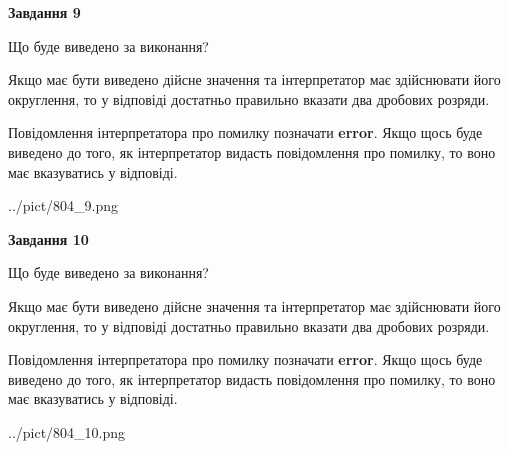 \documentclass[12pt, ukrainian]{article}
\begin{document}
{\begin {Large}
{\begin {center}\textbf{Завдання 9}\end {center}}\par
Що буде виведено за виконання? \par

Якщо має бути виведено дійсне значення та інтерпретатор має здійснювати його округлення, 
то у відповіді достатньо правильно вказати два дробових розряди.

Повідомлення інтерпретатора про помилку позначати \textbf{error}.
Якщо щось буде виведено до того, як інтерпретатор видасть повідомлення про помилку, 
то воно має вказуватись у відповіді. \par

\begin{center}
	{../pict/804_9.png}
\end{center}
\newpage

{\begin {center}\textbf{Завдання 10}\end {center}}\par
Що буде виведено за виконання? \par

Якщо має бути виведено дійсне значення та інтерпретатор має здійснювати його округлення, 
то у відповіді достатньо правильно вказати два дробових розряди.

Повідомлення інтерпретатора про помилку позначати \textbf{error}.
Якщо щось буде виведено до того, як інтерпретатор видасть повідомлення про помилку, 
то воно має вказуватись у відповіді. \par

\begin{center}
	{../pict/804_10.png}
\end{center}
\newpage

\end {Large}}
\end{document}
